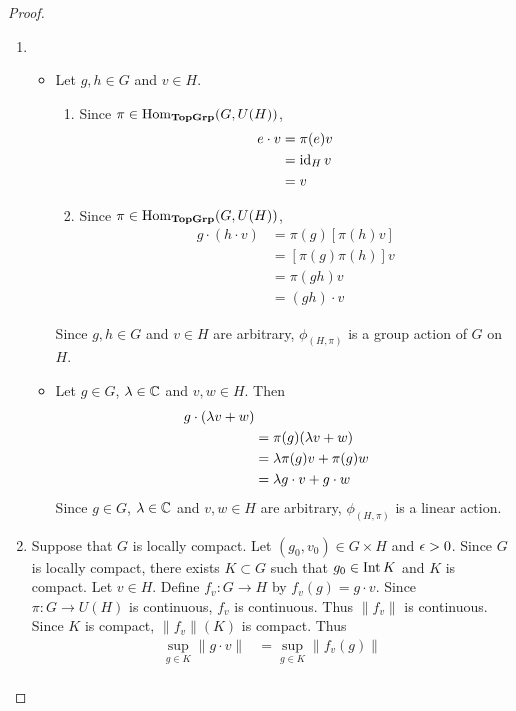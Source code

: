 \documentclass{book}
\begin{document}
	\begin{proof}\
		\begin{enumerate}
			\item 
			\begin{itemize}
				\item Let $g,h \in G$ and $v \in H$. 
				\begin{enumerate}
					\item Since $\pi \in \operatorname{Hom}_{\operatorname*{\text{\textbf{TopGrp}}}}(G, U(H))$, 
					\begin{align*}
						e \cdot v
						& = \pi(e)v \\
						& = \operatorname{id}_H v \\
						& = v
					\end{align*}
					\item Since $\pi \in \operatorname{Hom}_{\operatorname*{\text{\textbf{TopGrp}}}}(G, U(H))$, 
					\begin{align*}
						g \cdot (h \cdot v) 
						& = \pi(g)[\pi(h) v] \\
						& = [\pi(g) \pi(h)] v \\
						& = \pi(gh) v \\
						& = (gh) \cdot v
					\end{align*}
				\end{enumerate}
				Since $g,h \in G$ and $v \in H$ are arbitrary, $\phi_{(H, \pi)}$ is a group action of $G$ on $H$.
				\item Let $g \in G$, $\lambda \in \mathbb{C}$ and $v,w \in H$. Then 
				\begin{align*}
					g \cdot (\lambda v + w) \\
					& = \pi(g)(\lambda v + w) \\
					& = \lambda \pi(g) v + \pi(g) w \\
					& = \lambda g \cdot v + g \cdot w
				\end{align*} 
				Since $g \in G$, $\lambda \in \mathbb{C}$ and $v,w \in H$ are arbitrary, $\phi_{(H, \pi)}$ is a linear action.
			\end{itemize}
			\item Suppose that $G$ is locally compact. Let $(g_0, v_0) \in G \times H$ and $\epsilon > 0$. Since $G$ is locally compact, there exists $K \subset G$ such that $g_0 \in \operatorname{Int} K$ and $K$ is compact. Let $v \in H$. Define $f_v:G \rightarrow H$ by $f_v(g) = g \cdot v$. Since $\pi: G \rightarrow U(H)$ is continuous, $f_v$ is continuous. Thus $\|f_v\|$ is continuous. Since $K$ is compact, $\|f_v\|(K)$ is compact. Thus 
			\begin{align*}
				\sup\limits_{g \in K} \|g \cdot v\| 
				& = \sup\limits_{g \in K} \|f_v(g)\| \\

\end{align*}
\end{enumerate}
\end{proof}
\end{document}
